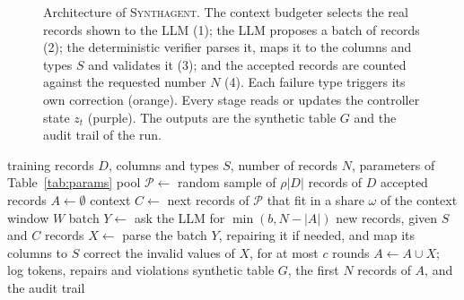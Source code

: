 \documentclass[conference]{IEEEtran}
\newcommand{\system}{\textsc{Synthagent}\xspace}
\begin{document}
\begin{figure}[t]
\centering
\resizebox{\textwidth}{!}{}
\caption{Architecture of \system. The context budgeter selects the real records shown to the LLM (1); the LLM proposes a batch of records (2); the deterministic verifier parses it, maps it to the columns and types $S$ and validates it (3); and the accepted records are counted against the requested number $N$ (4). Each failure type triggers its own correction (orange). Every stage reads or updates the controller state $z_t$ (purple). The outputs are the synthetic table $G$ and the audit trail of the run.}
\label{fig:architecture}
\end{figure}

\begin{algorithm}[t]
\caption{Generation procedure of \system}
\label{alg:loop}
\small
\begin{algorithmic}[1]
\Require training records $D$, columns and types $S$, number of records $N$, parameters of Table~\ref{tab:params}
\State pool $\mathcal{P}\gets$ random sample of $\rho|D|$ records of $D$
\State accepted records $A\gets\emptyset$ 
\Repeat
  \State context $C\gets$ next records of $\mathcal{P}$ that fit in a share $\omega$ of the context window $W$ 
  \State batch $Y\gets$ ask the LLM for $\min(b,N-|A|)$ new records, given $S$ and $C$ 
  \State records $X\gets$ parse the batch $Y$, repairing it if needed, and map its columns to $S$ 
  \State correct the invalid values of $X$, for at most $c$ rounds 
  \State $A\gets A\cup X$; log tokens, repairs and violations 
\State \Return synthetic table $G$, the first $N$ records of $A$, and the audit trail
\end{algorithmic}
\end{algorithm}
\end{document}
